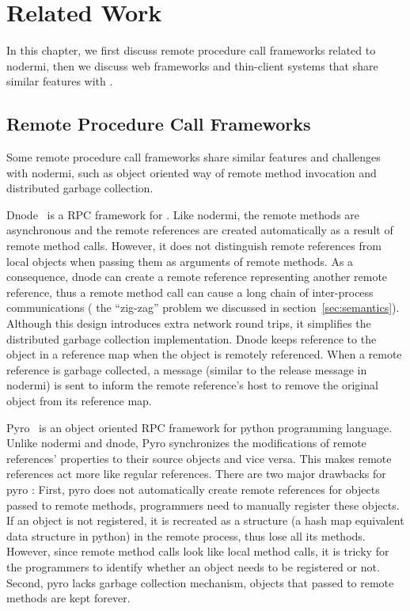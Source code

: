 \chapter{Related Work}

In this chapter, we first discuss remote procedure call frameworks 
related to nodermi, then we discuss web frameworks and thin-client systems
that share similar features with \cb.

\section{Remote Procedure Call Frameworks}
\label{sec:relatedrpc}

Some remote procedure call frameworks share similar features and challenges 
with nodermi, such as object oriented way of remote method invocation
and distributed garbage collection.

Dnode~\cite{dnode} is a RPC framework for \nodejs{}.  Like nodermi, the remote
methods are asynchronous and the remote references are created automatically
as a result of remote method calls. However, it does not distinguish remote
references from local objects  when passing them as arguments of remote
methods. As a consequence, dnode can create a remote reference representing
another remote reference,  thus  a remote method call can cause a long chain
of inter-process communications ( the ``zig-zag'' problem we discussed in
section~\ref{sec:semantics}). Although this design introduces extra network
round trips, it simplifies the distributed garbage collection implementation.
Dnode keeps reference to the object in a reference map when the object  is
remotely referenced. When a remote reference is garbage collected,  a
 message (similar to the release message in nodermi)  is sent to inform
the remote reference's host   to remove the original object from its reference
map.

 
Pyro~\cite{pyro} is an object oriented RPC framework for python programming
language. Unlike nodermi and dnode, Pyro synchronizes the modifications of
remote references' properties to their source  objects and vice versa. This
makes remote references act more like regular references. There are two major
drawbacks for pyro : First, pyro does not automatically create remote
references for objects passed to remote methods, programmers need to manually
register these objects. If an object is not registered, it is recreated as a
 structure (a hash map equivalent data structure in python) in the
remote process, thus lose all its methods. However, since remote method calls
look like local method calls, it is tricky for the programmers to identify
whether an object needs to be registered or not. Second, pyro lacks garbage
collection mechanism,  objects that passed to remote methods are kept forever.



